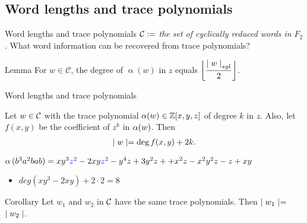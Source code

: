\documentclass[aspectratio={169}]{beamer}
\begin{document}
\subsection{Word lengths and trace polynomials}
\begin{frame}{Word lengths and trace polynomials}
$\mathcal{C} := $ \emph{the set of cyclically reduced words in $F_2$}.
\vskip 0.5cm
What word information can be recovered from trace polynomials?
\begin{block}{Lemma}
\label{same_slen}
For $w \in  \mathcal{C}$, the degree of $\operatorname{\alpha}(w)$ in $z$ equals $\left\lfloor{\dfrac{{\mid w \mid}_{syl}}{2}}\right\rfloor$.
\end{block}

\end{frame}
\begin{frame}{Word lengths and trace polynomials}
\begin{theorem}
Let $w \in \mathcal{C}$ with the trace polynomial $\operatorname{\alpha}(w) \in \mathbb{Z}[x,y,z]$ of degree $k$ in $z$. Also, let $f(x,y)$ be the coefficient of $z^k$ in $\operatorname{\alpha}(w)$. Then 
\begin{align*}
    \mid w \mid = \operatorname{deg}{f(x,y)} + 2k.
\end{align*}
\end{theorem}
\vskip 0.5cm
$\operatorname{\alpha}{(b^3a^2bab)}=xy^3\textcolor{blue}{z^2}-2xy\textcolor{blue}{z^2}-y^4z+3y^2z++x^2z-x^2y^2z-z+xy$
\begin{itemize}
[boldarrow]
\item $deg(xy^3-2xy) + 2\cdot2 = 8$
\end{itemize}
\begin{block}{Corollary}
Let $w_1$ and $w_2$ in $\mathcal{C}$ have the same trace polynomials. Then $\mid w_1 \mid$=$\mid w_2 \mid$.
\end{block}
\end{frame}
\end{document}
